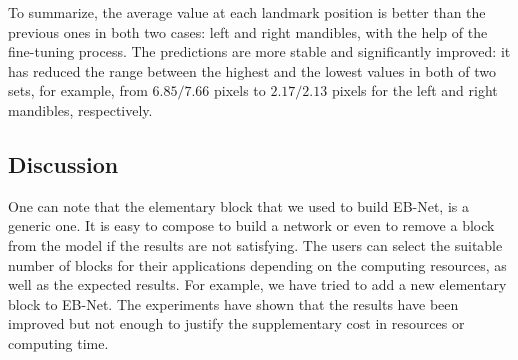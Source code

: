 \documentclass[review]{elsarticle}
\begin{document}
To summarize, the average value at each landmark position is better than the previous ones in both two cases: left and right mandibles, with the help of the fine-tuning process. The predictions are more stable and significantly improved: it has reduced the range between the highest and the lowest values in both of two sets, for example, from $6.85/ 7.66$ pixels to $2.17/ 2.13$ pixels for the left and right mandibles, respectively.

\subsection{Discussion}


One can note that the elementary block that we used to build EB-Net, is a generic one. It is easy to compose to build a network or even to remove a block from the model if the results are not satisfying. The users can select the suitable number of blocks for their applications depending on the computing resources, as well as the expected results. For example, we have tried to add a new elementary block to EB-Net. The experiments have shown that the results have been improved but not enough to justify the supplementary cost in resources or computing time.
\end{document}
